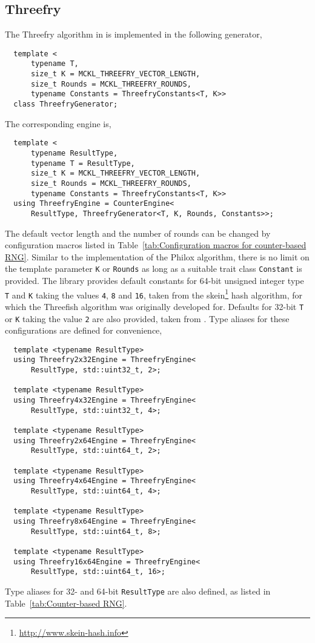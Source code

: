 \subsection{Threefry}
\label{sub:Threefry}

The Threefry algorithm in \cite{Salmon:2011um} is implemented in the following
generator,
\begin{Verbatim}
  template <
      typename T,
      size_t K = MCKL_THREEFRY_VECTOR_LENGTH,
      size_t Rounds = MCKL_THREEFRY_ROUNDS,
      typename Constants = ThreefryConstants<T, K>>
  class ThreefryGenerator;
\end{Verbatim}
The corresponding \rng engine is,
\begin{Verbatim}
  template <
      typename ResultType,
      typename T = ResultType,
      size_t K = MCKL_THREEFRY_VECTOR_LENGTH,
      size_t Rounds = MCKL_THREEFRY_ROUNDS,
      typename Constants = ThreefryConstants<T, K>>
  using ThreefryEngine = CounterEngine<
      ResultType, ThreefryGenerator<T, K, Rounds, Constants>>;
\end{Verbatim}
The default vector length and the number of rounds can be changed by
configuration macros listed in Table~\ref{tab:Configuration macros for
  counter-based RNG}. Similar to the implementation of the Philox algorithm,
there is no limit on the template parameter \verb|K| or \verb|Rounds| as long
as a suitable trait class \verb|Constant| is provided. The library provides
default constants for 64-bit unsigned integer type \verb|T| and \verb|K| taking
the values \verb|4|, \verb|8| and \verb|16|, taken from the
skein\footnote{\url{http://www.skein-hash.info}} hash algorithm, for which the
Threefish algorithm was originally developed for. Defaults for 32-bit \verb|T|
or \verb|K| taking the value \verb|2| are also provided, taken from
\cite{Salmon:2011um}. Type aliases for these configurations are defined for
convenience,
\begin{Verbatim}
  template <typename ResultType>
  using Threefry2x32Engine = ThreefryEngine<
      ResultType, std::uint32_t, 2>;

  template <typename ResultType>
  using Threefry4x32Engine = ThreefryEngine<
      ResultType, std::uint32_t, 4>;

  template <typename ResultType>
  using Threefry2x64Engine = ThreefryEngine<
      ResultType, std::uint64_t, 2>;

  template <typename ResultType>
  using Threefry4x64Engine = ThreefryEngine<
      ResultType, std::uint64_t, 4>;

  template <typename ResultType>
  using Threefry8x64Engine = ThreefryEngine<
      ResultType, std::uint64_t, 8>;

  template <typename ResultType>
  using Threefry16x64Engine = ThreefryEngine<
      ResultType, std::uint64_t, 16>;
\end{Verbatim}
Type aliases for 32- and 64-bit \verb|ResultType| are also defined, as listed
in Table~\ref{tab:Counter-based RNG}.

